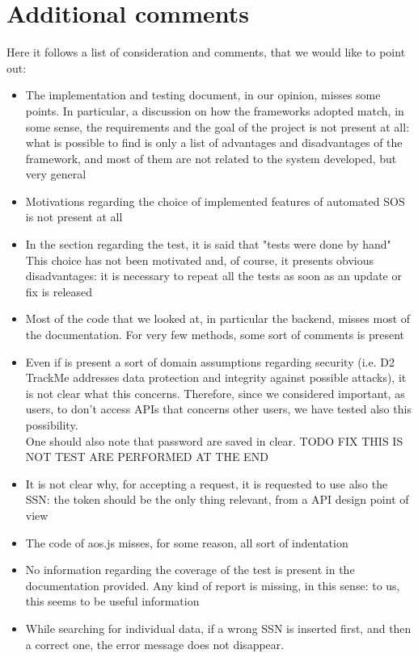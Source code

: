 \section{Additional comments}
Here it follows a list of consideration and comments, that we would like to point out:
\begin{itemize}
\item The implementation and testing document, in our opinion, misses some points. 
In particular, a discussion on how the frameworks adopted match, in some sense, the requirements and the goal of the project 
is not present at all: what is possible to find is only a list of advantages and disadvantages of the framework, and most of them are not
related to the system developed, but very general
\item Motivations regarding the choice of implemented features of automated SOS is not present at all
\item In the section regarding the test, it is said that "tests were done by hand"
This choice has not been motivated and, of course, it presents obvious disadvantages: it is necessary to repeat all the tests as soon as
an update or fix is released
\item Most of the code that we looked at, in particular the backend, misses most of the documentation. For very few methods, some sort
of comments is present
\item Even if is present a sort of domain assumptions regarding security (i.e. D2 TrackMe addresses data protection and integrity against
possible attacks), it is not clear what this concerns. Therefore, since we considered important, as users, to don't access APIs that
concerns other users, we have tested also this possibility. \\
One should also note that password are saved in clear.
TODO FIX THIS IS NOT TEST ARE PERFORMED AT THE END
\item It is not clear why, for accepting a request, it is requested to use also the SSN: the token should be the only thing relevant, from a
API design point of view
\item The code of aos.js misses, for some reason, all sort of indentation
\item No information regarding the coverage of the test is present in the documentation provided. 
Any kind of report is missing, in this sense: to us, this seems to be useful information
\item While searching for individual data, if a wrong SSN is inserted first, and then 
a correct one, the error message does not disappear. 


\end{itemize}
